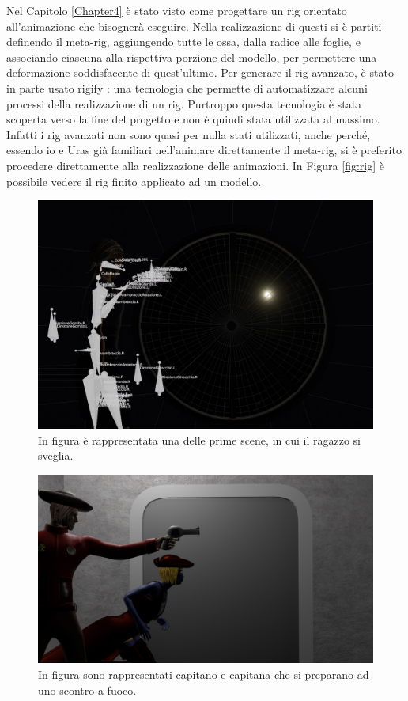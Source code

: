 Nel Capitolo \ref{Chapter4} è stato visto come progettare un rig orientato all'animazione che bisognerà eseguire.
Nella realizzazione di questi si è partiti definendo il meta-rig, aggiungendo tutte le ossa, dalla radice alle foglie, e associando ciascuna alla rispettiva porzione del modello, per permettere una deformazione soddisfacente di quest'ultimo.
Per generare il rig avanzato, è stato in parte usato rigify \cite{blendDoc}: una tecnologia che permette di automatizzare alcuni processi della realizzazione di un rig.
Purtroppo questa tecnologia è stata scoperta verso la fine del progetto e non è quindi stata utilizzata al massimo. 
Infatti i rig avanzati non sono quasi per nulla stati utilizzati, anche perché, essendo io e Uras già familiari nell'animare direttamente il meta-rig, si è preferito procedere direttamente alla realizzazione delle animazioni.
In Figura \ref{fig:rig} è possibile vedere il rig finito applicato ad un modello.
\begin{figure}
\centering
\includegraphics[width=\textwidth]{Figures/screen4}
\decoRule
\caption[Scena esempio 1]{In figura è rappresentata una delle prime scene, in cui il ragazzo si sveglia.}
\label{fig:eg1}
\end{figure}
\begin{figure}
\centering
\includegraphics[width=\textwidth]{Figures/screen1}
\decoRule
\caption[Scena esempio 2]{In figura sono rappresentati capitano e capitana che si preparano ad uno scontro a fuoco.}
\label{fig:eg2}
\end{figure}
